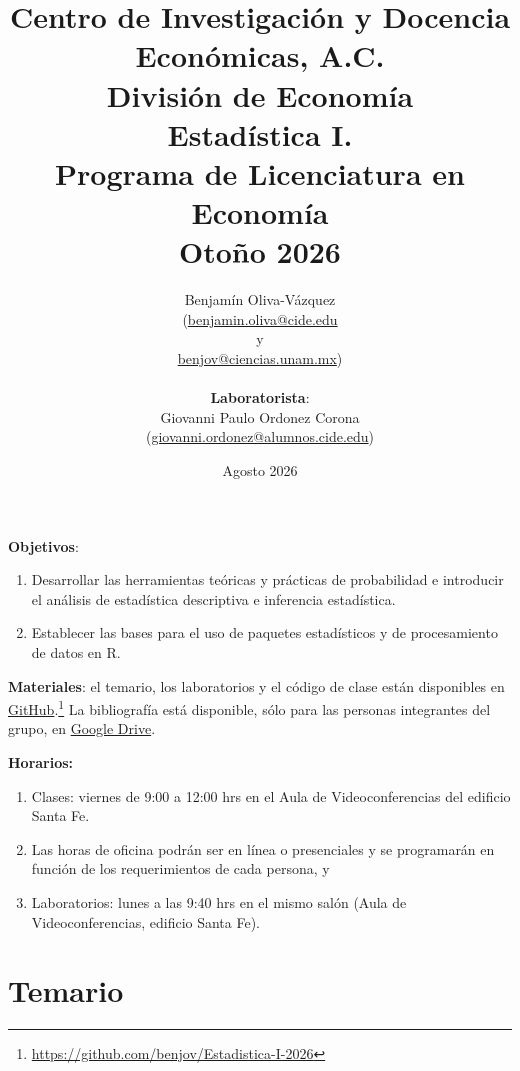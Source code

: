 \documentclass[letterpaper, 12pt]{article}
\title{\textbf{Centro de Investigación y Docencia Económicas, A.C.} \\ División de Economía \\ \textbf{Estadística I}. \\ Programa de Licenciatura en Economía \\ Otoño 2026}
\author{Benjamín Oliva-Vázquez \\ (\url{benjamin.oliva@cide.edu} \\ y \\ 
 \url{benjov@ciencias.unam.mx}) \\ \\ \textbf{Laboratorista}: \\ Giovanni Paulo Ordonez Corona \\ (\url{giovanni.ordonez@alumnos.cide.edu}) }
\date{Agosto 2026}
\begin{document}
\maketitle

\textbf{Objetivos}: 
\begin{enumerate}
    \item Desarrollar las herramientas teóricas y prácticas de probabilidad e introducir el análisis de estadística descriptiva e inferencia estadística.
    
    \item Establecer las bases para el uso de paquetes estadísticos y de procesamiento de datos en R.
\end{enumerate}

\textbf{Materiales}: el temario, los laboratorios y el código de clase están disponibles en \href{https://github.com/benjov/Estadistica-I-2026}{GitHub}.\footnote{\url{https://github.com/benjov/Estadistica-I-2026}} La bibliografía está disponible, sólo para las personas integrantes del grupo, en \href{https://drive.google.com/drive/folders/1eQlLrz9h-DBz7NLsZazcqHM0bCM204w_?usp=sharing}{Google Drive}.

\textbf{Horarios:} 
\begin{enumerate}
\item Clases: viernes de 9:00 a 12:00 hrs en el Aula de Videoconferencias del edificio Santa Fe.

\item Las horas de oficina podrán ser en línea o presenciales y se programarán en función de los requerimientos de cada persona, y 

\item Laboratorios: lunes a las 9:40 hrs en el mismo salón (Aula de Videoconferencias, edificio Santa Fe).
\end{enumerate}

\section{Temario}
\end{document}
